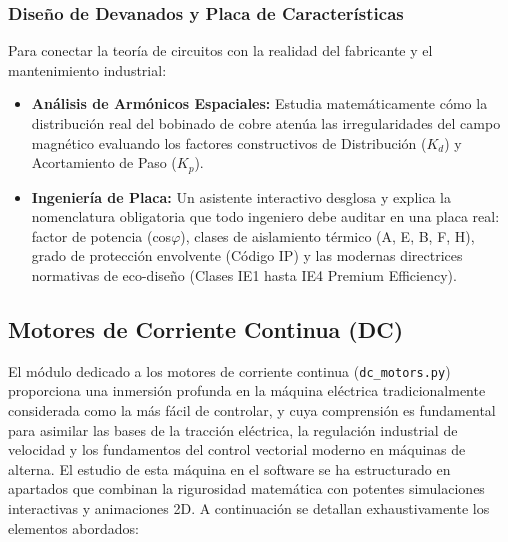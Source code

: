 \documentclass[11pt,a4paper]{article}
\begin{document}
\subsubsection{Diseño de Devanados y Placa de Características}
Para conectar la teoría de circuitos con la realidad del fabricante y el mantenimiento industrial:
\begin{itemize}
    \item \textbf{Análisis de Armónicos Espaciales:} Estudia matemáticamente cómo la distribución real del bobinado de cobre atenúa las irregularidades del campo magnético evaluando los factores constructivos de Distribución ($K_d$) y Acortamiento de Paso ($K_p$).
    \item \textbf{Ingeniería de Placa:} Un asistente interactivo desglosa y explica la nomenclatura obligatoria que todo ingeniero debe auditar en una placa real: factor de potencia (cos$\varphi$), clases de aislamiento térmico (A, E, B, F, H), grado de protección envolvente (Código IP) y las modernas directrices normativas de eco-diseño (Clases IE1 hasta IE4 Premium Efficiency).
\end{itemize}

\subsection{Motores de Corriente Continua (DC)}
El módulo dedicado a los motores de corriente continua (\texttt{dc\_motors.py}) proporciona una inmersión profunda en la máquina eléctrica tradicionalmente considerada como la más fácil de controlar, y cuya comprensión es fundamental para asimilar las bases de la tracción eléctrica, la regulación industrial de velocidad y los fundamentos del control vectorial moderno en máquinas de alterna. El estudio de esta máquina en el software se ha estructurado en apartados que combinan la rigurosidad matemática con potentes simulaciones interactivas y animaciones 2D. A continuación se detallan exhaustivamente los elementos abordados:
\end{document}
